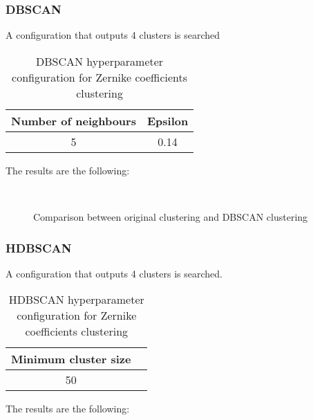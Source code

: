 		\subsubsection{DBSCAN}
			
			A configuration that outputs 4 clusters is searched
			
			\begin{table}[h!]
				\centering
				\begin{tabular}{|c|c|}
					\hline
					\textbf{Number of neighbours} & \textbf{Epsilon}\\
					\hline
					5 & 0.14\\
					\hline
				\end{tabular}
				\caption{DBSCAN hyperparameter configuration for Zernike coefficients clustering}
			\end{table}
		
			The results are the following:
			
			\begin{figure*}[ht!]
				\centering
				\hspace{\fill}
				\\
					
				\hspace{\fill}
				\caption{Comparison between original clustering and DBSCAN clustering}
			\end{figure*}
		\FloatBarrier
		
		\subsubsection{HDBSCAN}
			
			A configuration that outputs 4 clusters is searched.
			
			\begin{table}[h!]
				\centering
				\begin{tabular}{|c|c|}
					\hline
					\textbf{Minimum cluster size} \\
					\hline
					50 \\
					\hline
				\end{tabular}
				\caption{HDBSCAN hyperparameter configuration for Zernike coefficients clustering}
			\end{table}
			\FloatBarrier
			The results are the following:
			

